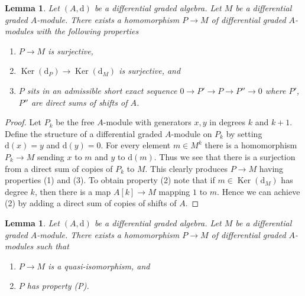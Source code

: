 \documentclass{stacks-project}
\theoremstyle{plain}
\newtheorem{lemma}[subsection]{Lemma}
\theoremstyle{definition}
\theoremstyle{remark}
\numberwithin{equation}{subsection}
\def\Ker{\mathop{\mathrm{Ker}}}
\begin{document}
\begin{lemma}
\label{lemma-good-quotient}
Let $(A, \text{d})$ be a differential graded algebra.
Let $M$ be a differential graded $A$-module. There exists a homomorphism
$P \to M$ of differential graded $A$-modules with the following
properties
\begin{enumerate}
\item $P \to M$ is surjective,
\item $\Ker(\text{d}_P) \to \Ker(\text{d}_M)$ is surjective, and
\item $P$ sits in an admissible short exact sequence
$0 \to P' \to P \to P'' \to 0$ where $P'$, $P''$ are direct sums
of shifts of $A$.
\end{enumerate}
\end{lemma}

\begin{proof}
Let $P_k$ be the free $A$-module with generators $x, y$ in degrees
$k$ and $k + 1$. Define the structure of a differential graded
$A$-module on $P_k$ by setting $\text{d}(x) = y$ and $\text{d}(y) = 0$.
For every element $m \in M^k$ there is a homomorphism
$P_k \to M$ sending $x$ to $m$ and $y$ to $\text{d}(m)$.
Thus we see that there is a surjection from a direct sum
of copies of $P_k$ to $M$. This clearly produces $P \to M$
having properties (1) and (3). To obtain property (2) note
that if $m \in \Ker(\text{d}_M)$ has degree $k$, then there is a map
$A[k] \to M$ mapping $1$ to $m$. Hence we can achieve (2) by adding
a direct sum of copies of shifts of $A$.
\end{proof}

\begin{lemma}
\label{lemma-resolve}
Let $(A, \text{d})$ be a differential graded algebra.
Let $M$ be a differential graded $A$-module. There exists a homomorphism
$P \to M$ of differential graded $A$-modules such that
\begin{enumerate}
\item $P \to M$ is a quasi-isomorphism, and
\item $P$ has property (P).
\end{enumerate}
\end{lemma}
\end{document}
